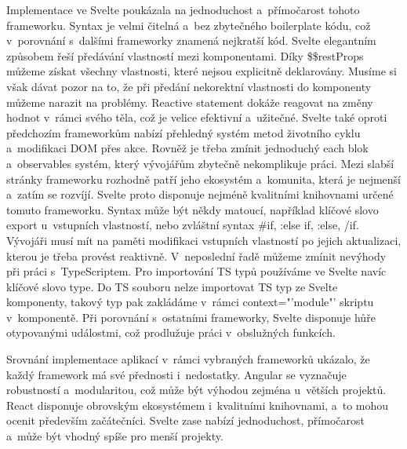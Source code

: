 Implementace ve Svelte poukázala na jednoduchost a~přímočarost tohoto frameworku. 
Syntax je velmi čitelná a~bez zbytečného boilerplate kódu, což v~porovnání s~dalšími frameworky znamená nejkratší kód. 
Svelte elegantním způsobem řeší předávání vlastností mezi komponentami. 
Díky \$\$restProps můžeme získat všechny vlastnosti, které nejsou explicitně deklarovány. 
Musíme si však dávat pozor na to, že při předání nekorektní vlastnosti do komponenty můžeme narazit na problémy. 
Reactive statement dokáže reagovat na změny hodnot v~rámci svého těla, což je velice efektivní a~užitečné. 
Svelte také oproti předchozím frameworkům nabízí přehledný systém metod životního cyklu a~modifikaci DOM přes akce. 
Rovněž je třeba zmínit jednoduchý each blok a~observables systém, který vývojářům zbytečně nekomplikuje práci.
Mezi slabší stránky frameworku rozhodně patří jeho ekosystém a~komunita, která je nejmenší a~zatím se rozvíjí. 
Svelte proto disponuje nejméně kvalitními knihovnami určené tomuto frameworku. 
Syntax může být někdy matoucí, například klíčové slovo export u~vstupních vlastností, nebo zvláštní syntax \#if, :else if, :else, /if. 
Vývojáři musí mít na paměti modifikaci vstupních vlastností po jejich aktualizaci, kterou je třeba provést reaktivně. 
V~neposlední řadě můžeme zmínit nevýhody při práci s~TypeScriptem. Pro importování TS typů používáme ve Svelte navíc klíčové slovo type. 
Do TS souboru nelze importovat TS typ ze Svelte komponenty, takový typ pak zakládáme v~rámci context="'module"' skriptu v~komponentě.
Při porovnání s~ostatními frameworky, Svelte disponuje hůře otypovanými událostmi, což prodlužuje práci v~obslužných funkcích.


Srovnání implementace aplikací v~rámci vybraných frameworků ukázalo, že každý framework má své přednosti i~nedostatky. 
Angular se vyznačuje robustností a~modularitou, což může být výhodou zejména u~větších projektů. 
React disponuje obrovským ekosystémem i~kvalitními knihovnami, a~to mohou ocenit především začátečníci. 
Svelte zase nabízí jednoduchost, přímočarost a~může být vhodný spíše pro menší projekty.